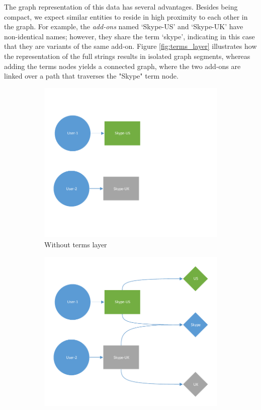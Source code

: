 \documentclass[11pt,oneside]{book}
\begin{document}
The graph representation of this data has several advantages. Besides being compact, we expect similar entities to reside in high proximity to each other in the graph. For example, the {\it add-ons} named `Skype-US' and `Skype-UK' have non-identical names; however, they share the term `skype', indicating in this case that they are variants of the same add-on. Figure \ref{fig:terms_layer} illustrates how the representation of the full strings results in isolated graph segments, whereas adding the terms nodes yields a connected graph, where the two add-ons are linked over a path that traverses the "Skype" term node.

\begin{figure}[!htbp]
\centering
\begin{subfigure}[b]{0.49\textwidth}
	\centering
	\includegraphics[width=\textwidth]{figures/skype_exampe1.pdf}
	\caption{Without terms layer}
\end{subfigure}
\begin{subfigure}[b]{0.49\textwidth}
	\centering
	\includegraphics[width=\textwidth]{figures/skype_exampe2.pdf}

\end{subfigure}
\end{figure}
\end{document}
